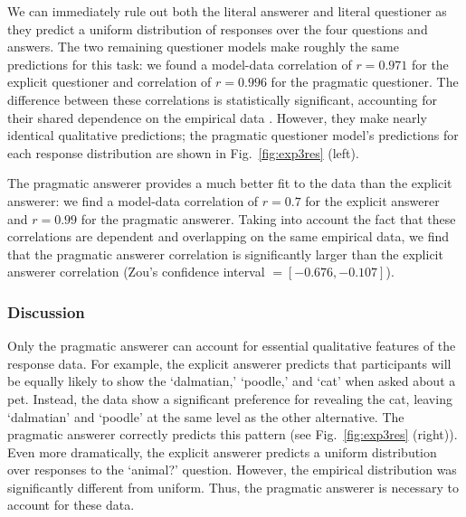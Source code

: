 \documentclass[12pt, floatsintext, jou]{apa6}
\begin{document}
We can immediately rule out both the literal answerer and literal questioner as they predict a uniform distribution of responses over the four questions and answers. The two remaining questioner models make roughly the same predictions for this task:
we found a model-data correlation of $r = 0.971$ for the explicit questioner and correlation of $r = 0.996$ for the pragmatic questioner. The difference between these correlations is statistically significant, accounting for their shared dependence on the empirical data \cite[Zou's 95\% confidence interval \textrm{= [-0.079, -0.009]}]{DiedenhofenMusch14_cocor}. However, they make nearly identical qualitative predictions; the pragmatic questioner model's predictions for each response distribution are shown in Fig.~\ref{fig:exp3res} (left). 

The pragmatic answerer provides a much better fit to the data than the explicit answerer: we find a model-data correlation of $r = 0.7$ for the explicit answerer and $r = 0.99$ for the pragmatic answerer.  Taking into account the fact that these correlations are dependent and overlapping on the same empirical data, we find that the pragmatic answerer correlation is significantly larger than the explicit answerer correlation (Zou's confidence interval $= [-0.676, -0.107]$). 


\subsubsection{Discussion}

Only the pragmatic answerer can account for essential qualitative features of the response data. For example, the explicit answerer predicts that participants will be equally likely to show the `dalmatian,' `poodle,' and `cat' when asked about a pet. Instead, the data show a significant preference for revealing the cat, leaving `dalmatian' and `poodle' at the same level as the other alternative. The pragmatic answerer correctly predicts this pattern  (see Fig.~\ref{fig:exp3res} (right)). Even more dramatically, the explicit answerer predicts a uniform distribution over responses to the `animal?' question. %
However, the empirical distribution was significantly different from uniform. Thus, the pragmatic answerer is necessary to account for these data.
\end{document}
